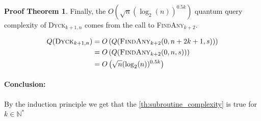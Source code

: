 \documentclass[11pt,a4paper]{article}
\newcommand{\Dyck}[1]{\textsc{Dyck$_{#1}$}}
\newcommand{\FA}[1]{\textsc{FindAny$_{#1}$}}
\newcommand{\Conc}[1]{\paragraph*{Conclusion:}{#1}}
\theoremstyle{definition}
\theoremstyle{plain}
\theoremstyle{definition}
\newtheorem{tproof}{Proof Theorem}[section]
\begin{document}
\begin{appendix}
\begin{tproof}
{            Finally, the $O\left( \sqrt{n}(\log_2(n))^{0.5k} \right)$ quantum query complexity of \Dyck{k+1,n} comes from the
            call to \FA{k+2}.

            \begin{align*}
                Q(\textrm{\Dyck{k+1,n}}) & = O\left(Q(\textrm{\FA{k+2}}(0,n+2k+1,s))\right) \\
                                         & = O\left(Q(\textrm{\FA{k+2}}(0, n, s))\right)    \\
                                         & = O\left( \sqrt{n}(\log_2(n))^{0.5k} \right)
            \end{align*}

        }

        \Conc{By the induction principle we get that the \autoref{th:subroutine_complexity} is true for $k \in \mathbb{N}^*$}
    \end{tproof}

\end{appendix}
\end{document}
